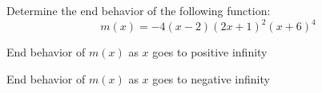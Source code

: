 \documentclass{ximera}
\author{David Kish}
\begin{document}
Determine the end behavior of the following function:
\[
m(x)=-4(x-2)(2x+1)^2(x+6)^4
\]
\begin{exercise}
End behavior of $m(x)$ as $x$ goes to positive infinity
\begin{multipleChoice}
\end{multipleChoice}
\end{exercise}
\begin{exercise}
End behavior of $m(x)$ as $x$ goes to negative infinity
\begin{multipleChoice}
\end{multipleChoice}
\end{exercise}
\end{document}
